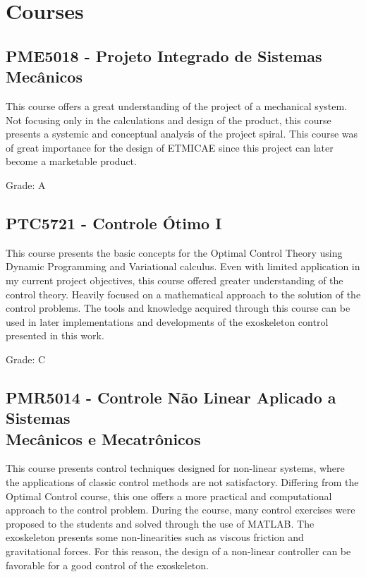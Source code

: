\chapter{Courses}

\section{PME5018 - Projeto Integrado de Sistemas Mecânicos}

This course offers a great understanding of the project of a mechanical system. Not focusing only in the calculations and design of the product, this course presents a systemic and conceptual analysis of the project spiral. This course was of great importance for the design of ETMICAE since this project can later become a marketable product.

Grade: A

\section{PTC5721 - Controle Ótimo I}

This course presents the basic concepts for the Optimal Control Theory using Dynamic Programming and Variational calculus. Even with limited application in my current project objectives, this course offered greater understanding of the control theory. Heavily focused on a mathematical approach to the solution of the control problems. The tools and knowledge acquired through this course can be used in later implementations and developments of the exoskeleton control presented in this work.

Grade: C

\section{PMR5014 - Controle Não Linear Aplicado a Sistemas \\ Mecânicos e Mecatrônicos}

This course presents control techniques designed for non-linear systems, where the applications of classic control methods are not satisfactory. Differing from the Optimal Control course, this one offers a more practical and computational approach to the control problem. During the course, many control exercises were proposed to the students and solved through the use of MATLAB\textsuperscript{\textregistered}.  The exoskeleton presents some non-linearities such as viscous friction and gravitational forces. For this reason, the design of a non-linear controller can be favorable for a good control of the exoskeleton. 

